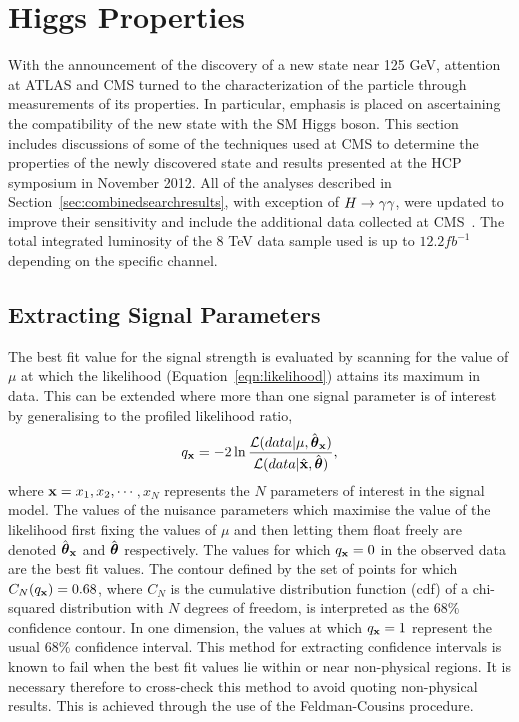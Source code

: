 \section{Higgs Properties}
\label{sec:properties}

With the announcement of the discovery of a new state near 125 GeV, attention at ATLAS and CMS 
turned to the characterization of the particle through  measurements of its properties. 
In particular, emphasis is placed on ascertaining the compatibility 
of the new state with the SM Higgs boson.
This section includes discussions of some of the techniques used at CMS to determine the properties 
of the newly discovered state and results presented at the HCP symposium in November 2012. 
All of the analyses described in Section~\ref{sec:combinedsearchresults},
with exception of $H\rightarrow\gamma\gamma$, were updated to improve their sensitivity 
and include the additional data collected at CMS~\citep{HIG-12-045}. The total integrated 
luminosity of the 8 TeV data sample used is up to $12.2 fb^{-1}$ depending on the
specific channel.

\subsection{Extracting Signal Parameters}

The best fit value for the signal strength is evaluated 
by scanning for the value of $\mu$ at which the likelihood (Equation~\ref{eqn:likelihood})
attains its maximum in data. This can be extended where more than one signal parameter
is of interest by generalising to the profiled likelihood ratio,
\begin{equation}
q_{{\mathbf{x}}} = 
	-2\ln\frac{\displaystyle \mathcal{L}(data | \mu,\hat{{\boldsymbol{\theta}}}_{{\mathbf{x}}})}
	{\displaystyle \mathcal{L}(data | \hat{{\mathbf{x}}},\hat{{\boldsymbol{\theta}}})}, 
\label{eqn:llrNd}
\end{equation}
where ${\mathbf{x}}=x_{1},x_{2},\cdots$$,x_{N}$ represents the $N$ parameters
of interest in the signal model. The values of the nuisance parameters 
which maximise the value of the likelihood first 
fixing the values of $\mu$ and then letting them float freely are
denoted $\hat{{\boldsymbol{\theta}}}_{{\mathbf{x}}}$ and $\hat{{\boldsymbol{\theta}}}$ respectively.
The values for which $q_{{\mathbf{x}}}=0$ in the observed data are the best fit values.
The contour defined by the set of points for which $C_{N}(q_{{\mathbf{x}}})=0.68$,
where $C_{N}$ is the cumulative distribution function (cdf) of a chi-squared distribution
with $N$ degrees of freedom, is interpreted
as the 68\% confidence contour. In one dimension, the values at which $q_{{\mathbf{x}}}=1$
represent the usual 68\% confidence interval.
This method for extracting confidence intervals is known to fail when the best fit 
values lie within or near non-physical regions.
It is necessary therefore to cross-check this method to avoid quoting
non-physical results. This is achieved through the use of the Feldman-Cousins procedure.

